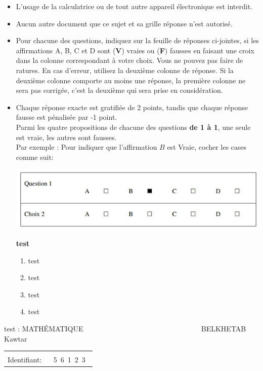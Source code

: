 \documentclass{book}%
\begin{document}
\begin{itemize}%
\item%
L'usage de la calculatrice ou de tout autre appareil électronique est interdit.%
\item%
Aucun autre document que ce sujet et sa grille réponse n'est autorisé.%
\item%
Pour chacune des questions, indiquez sur la feuille de réponses ci-jointes, si les affirmations A, B, C et D sont (\textbf{V}) vraies ou (\textbf{F}) fausses en faisant une croix dans la colonne correspondant à votre choix. Vous ne pouvez pas faire de ratures. En cas d'erreur, utilisez la deuxième colonne de réponse. Si la deuxième colonne comporte au moins une réponse, la première colonne ne sera pas corrigée, c'est la deuxième qui sera prise en considération.%
\item%
Chaque réponse exacte est gratifiée de 2 points, tandis que chaque réponse fausse est pénalisée par -1 point. \\ 	Parmi les quatre propositions de chacune des questions \textbf{de 1 à 1}, une seule est vraie, les autres sont fausses. \\ 	Par exemple : Pour indiquer que l'affirmation $B$ est Vraie, cocher les cases comme suit:  \\ \begin{center}	\includegraphics[scale=0.8]{reponses.png} \end{center}%
\thispagestyle{empty}%
\begin{exercise}%
\textbf{test }%
\begin{enumerate}[label=\textbf{\Alph*. }]%
\item%
test%
\item%
test%
\item%
test%
\item%
test%
\end{enumerate}%
\end{exercise}%
\end{itemize}%
\newpage%
\thispagestyle{empty}%
test : MATHÉMATIQUE $\qquad \qquad \qquad \qquad \qquad \qquad \qquad \qquad$ BELKHETAB Kawtar%
\begin{flushright}%
\begin{tabular}{|l|}%
\hline%
 \\%
\thispagestyle{empty}%
Identifiant: $\quad$ {\Large 5~6~1~2~3~}%
 \\%
\hline%
\end{tabular}%
\end{flushright}%
\end{document}
